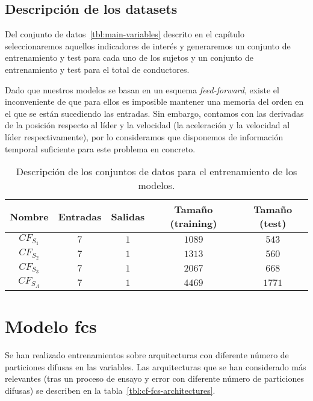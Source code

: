 \subsection{Descripción de los datasets}

Del conjunto de datos~\ref{tbl:main-variables} descrito en el capítulo~ seleccionaremos aquellos indicadores de interés y generaremos un conjunto de entrenamiento y test para cada uno de los sujetos y un conjunto de entrenamiento y test para el total de conductores.

Dado que nuestros modelos se basan en un esquema \textit{feed-forward}, existe el inconveniente de que para ellos es imposible mantener una memoria del orden en el que se están sucediendo las entradas. Sin embargo, contamos con las derivadas de la posición respecto al líder y la velocidad (la aceleración y la velocidad al líder respectivamente), por lo consideramos que disponemos de información temporal suficiente para este problema en concreto.

\begin{table}
	\caption[Descripción de los conjuntos de datos]{Descripción de los conjuntos de datos para el entrenamiento de los modelos.}
	\label{tbl:cf-datasets-description}
	\begin{tabular}{ccccc}
		\toprule
		Nombre & Entradas & Salidas & Tamaño (training) & Tamaño (test) \\
		\midrule
		$CF_{S_1}$ & $7$ & $1$ & $1089$ & $543$ \\
		$CF_{S_2}$ & $7$ & $1$ & $1313$ & $560$ \\
		$CF_{S_3}$ & $7$ & $1$ & $2067$ & $668$ \\
		$CF_{S_A}$ & $7$ & $1$ & $4469$ & $1771$ \\
		\bottomrule
	\end{tabular}
\end{table}

\section{Modelo \ac{fcs}}

Se han realizado entrenamientos sobre arquitecturas con diferente número de particiones difusas en las variables. Las arquitecturas que se han considerado más relevantes (tras un proceso de ensayo y error con diferente número de particiones difusas) se describen en la tabla~\ref{tbl:cf-fcs-architectures}. 

